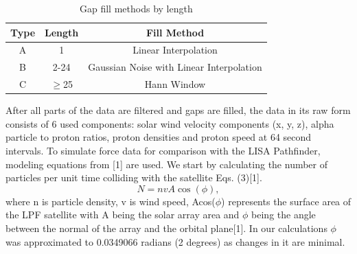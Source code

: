 \documentclass[%
 reprint,
 amsmath,amssymb,
 aps,
]{revtex4-2}
\begin{document}
\begin{table}[htbp]
\caption{Gap fill methods by length}
\begin{center}
\renewcommand{\arraystretch}{1.5}
\begin{tabular}{|c|c|c|}
\hline
Type & Length & Fill Method\\
\hline
A & 1 & Linear Interpolation\\
\hline
B & 2-24 & Gaussian Noise with Linear Interpolation\\
\hline
C & $\geq$25 & Hann Window\\
\hline

\end{tabular}
\label{tab1}
\end{center}
\end{table}



After all parts of the data are filtered and gaps are filled, the data in its raw form consists of 6 used components: solar wind velocity components (x, y, z), alpha particle to proton ratios, proton densities and proton speed at 64 second intervals. To simulate force data for comparison with the LISA Pathfinder, modeling equations from [1] are used. We start by calculating the number of particles per unit time colliding with the satellite Eqs. (3)[1].
\begin{equation}\label{eq:Hanning Window}
N=n v A\cos(\phi),
\end{equation}
where n is particle density, v is wind speed, Acos(\(\phi\)) represents the surface area of the LPF satellite with A being the solar array area and \(\phi\) being the angle between the normal of the array and the orbital plane[1]. In our calculations \(\phi\) was approximated to 0.0349066 radians (2 degrees) as changes in it are minimal.
\end{document}

